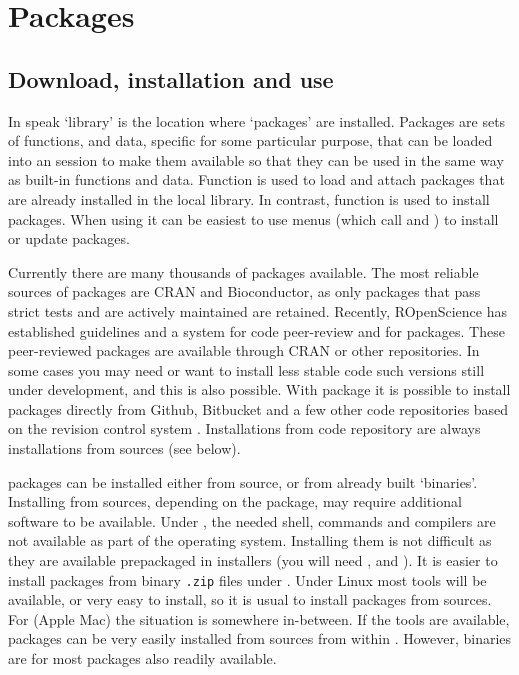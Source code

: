 \documentclass[krantz2]{krantz}\usepackage{knitr}%
\begin{document}
\section{Packages}\label{sec:script:packages}

\subsection{Download, installation and use}

In  speak `library' is the location where `packages' are installed. Packages are sets of functions, and data, specific for some particular purpose, that can be loaded into an \Rlang session to make them available so that they can be used in the same way as built-in \Rlang functions and data. Function  is used to load and attach packages that are already installed in the local \Rlang library. In contrast, function  is used to install packages. When using \RStudio it can be easiest to use \RStudio menus (which call  and ) to install or update packages.

Currently there are many thousands of packages available. The most reliable sources of packages are CRAN and Bioconductor, as only packages that pass strict tests and are actively maintained are retained. Recently, ROpenScience has established guidelines and a system for code peer-review and for packages. These peer-reviewed packages are available through CRAN or other repositories. In some cases you may need or want to install less stable code such versions still under development, and this is also possible. With package  it is possible to install packages directly from Github, Bitbucket and a few other code repositories based on the revision control system . Installations from code repository are always installations from sources (see below).

\Rpgrm packages can be installed either from source, or from already built `binaries'. Installing from sources, depending on the package, may require additional software to be available. Under , the needed shell, commands and compilers are not available as part of the operating system. Installing them is not difficult as they are available prepackaged in installers (you will need , and ). It is easier to install packages from binary \texttt{.zip} files under . Under Linux most tools will be available, or very easy to install, so it is usual to install packages from sources. For  (Apple Mac) the situation is somewhere in-between. If the tools are available, packages can be very easily installed from sources from within \RStudio. However, binaries are for most packages also readily available.
\end{document}
